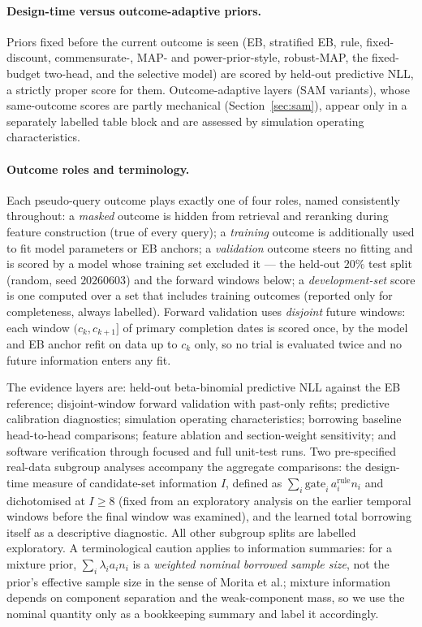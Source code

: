 \documentclass[11pt]{article}
\begin{document}
\paragraph{Design-time versus outcome-adaptive priors.} Priors fixed before
the current outcome is seen (EB, stratified EB, rule, fixed-discount,
commensurate-, MAP- and power-prior-style, robust-MAP, the fixed-budget
two-head, and the selective model) are scored by held-out predictive NLL, a
strictly proper score for them. Outcome-adaptive layers (SAM variants), whose
same-outcome scores are partly mechanical (Section~\ref{sec:sam}), appear only
in a separately labelled table block and are assessed by simulation operating
characteristics.

\paragraph{Outcome roles and terminology.} Each pseudo-query outcome plays
exactly one of four roles, named consistently throughout: a \emph{masked}
outcome is hidden from retrieval and reranking during feature construction
(true of every query); a \emph{training} outcome is additionally used to fit
model parameters or EB anchors; a \emph{validation} outcome steers no fitting
and is scored by a model whose training set excluded it --- the held-out $20\%$
test split (random, seed $20260603$) and the forward windows below; a
\emph{development-set} score is one computed over a set that includes training
outcomes (reported only for completeness, always labelled). Forward validation
uses \emph{disjoint} future windows: each window $(c_k, c_{k+1}]$ of primary
completion dates is scored once, by the model and EB anchor refit on data
up to $c_k$ only, so no trial is evaluated twice and no future information
enters any fit.

The evidence layers are: held-out beta-binomial predictive NLL against the EB
reference; disjoint-window forward validation with past-only refits;
predictive calibration diagnostics; simulation operating characteristics;
borrowing baseline head-to-head comparisons; feature ablation and
section-weight sensitivity; and software verification through focused and full
unit-test runs. Two pre-specified real-data subgroup analyses accompany the
aggregate comparisons: the design-time measure of candidate-set
information $I$,
defined as $\sum_i \mathrm{gate}_i\, a^{\mathrm{rule}}_i n_i$ and
dichotomised at $I \ge 8$
(fixed from an exploratory analysis on the earlier temporal windows before the
final window was examined), and the learned total borrowing itself as a
descriptive diagnostic. All other subgroup splits are labelled exploratory.
A terminological caution applies to information summaries: for a mixture
prior, $\sum_i \lambda_i a_i n_i$ is a \emph{weighted nominal borrowed sample
size}, not the prior's effective sample size in the sense of Morita et al.;
mixture information depends on component separation and the weak-component
mass, so we use the nominal quantity only as a bookkeeping summary and label
it accordingly.
\end{document}
